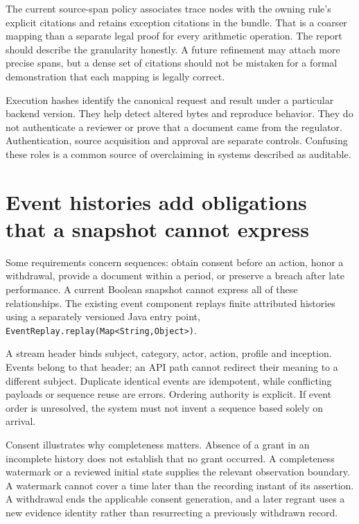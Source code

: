 The current source-span policy associates trace nodes with the owning rule's
explicit citations and retains exception citations in the bundle. That is a
coarser mapping than a separate legal proof for every arithmetic operation. The
report should describe the granularity honestly. A future refinement may attach
more precise spans, but a dense set of citations should not be mistaken for a
formal demonstration that each mapping is legally correct.

Execution hashes identify the canonical request and result under a particular
backend version. They help detect altered bytes and reproduce behavior. They do
not authenticate a reviewer or prove that a document came from the regulator.
Authentication, source acquisition and approval are separate controls. Confusing
these roles is a common source of overclaiming in systems described as auditable.

\section{Event histories add obligations that a snapshot cannot express}
\label{merge:M07:11}


Some requirements concern sequences: obtain consent before an action, honor a
withdrawal, provide a document within a period, or preserve a breach after late
performance. A current Boolean snapshot cannot express all of these relationships.
The existing event component replays finite attributed histories using a separately
versioned Java entry point, \texttt{EventReplay.replay(Map<String,Object>)}.

A stream header binds subject, category, actor, action, profile and inception.
Events belong to that header; an API path cannot redirect their meaning to a
different subject. Duplicate identical events are idempotent, while conflicting
payloads or sequence reuse are errors. Ordering authority is explicit. If event
order is unresolved, the system must not invent a sequence based solely on arrival.

Consent illustrates why completeness matters. Absence of a grant in an incomplete
history does not establish that no grant occurred. A completeness watermark or a
reviewed initial state supplies the relevant observation boundary. A watermark
cannot cover a time later than the recording instant of its assertion. A
withdrawal ends the applicable consent generation, and a later regrant uses a new
evidence identity rather than resurrecting a previously withdrawn record.


